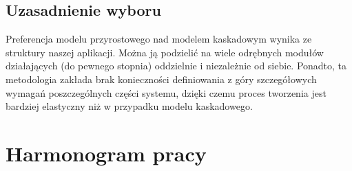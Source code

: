 \documentclass{article}
\let\oldsection\section
\renewcommand\section{\clearpage\oldsection} %
\begin{document}
\subsection{Uzasadnienie wyboru}

Preferencja modelu przyrostowego nad modelem kaskadowym wynika ze struktury naszej aplikacji. Można ją podzielić na wiele odrębnych modułów działających (do pewnego stopnia) oddzielnie i niezależnie od siebie. Ponadto, ta metodologia zakłada brak konieczności definiowania z góry szczegółowych wymagań poszczególnych części systemu, dzięki czemu proces tworzenia jest bardziej elastyczny niż w przypadku modelu kaskadowego.

\section{Harmonogram pracy}
\end{document}
